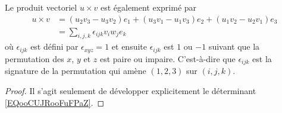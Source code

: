 \begin{lemma}       \label{LEMooYKNPooGVMuse}
	Le produit vectoriel \( u\times v\) est également exprimé par
	\begin{subequations}        \label{EQSooOWGZooNYruoy}
		\begin{align}
			u\times v & =(u_2v_3-u_3v_2)e_1+(u_3v_1-u_1v_3)e_2+(u_1v_2-u_2v_1)e_3     \label{SEBEQooVROKooRpUOIr} \\
			          & =\sum_{i,j,k}\epsilon_{ijk}v_iw_je_k
		\end{align}
	\end{subequations}
	où \( \epsilon_{ijk}\) est défini par \( \epsilon_{xyz}=1\) et ensuite \( \epsilon_{ijk}\) est \( 1\) ou \( -1\) suivant que la permutation des \( x\), \( y\) et \( z\) est paire ou impaire. C'est-à-dire que \( \epsilon_{ijk}\) est la signature de la permutation qui amène \( (1,2,3)\) sur \( (i,j,k)\).
\end{lemma}

\begin{proof}
	Il s'agit seulement de développer explicitement le déterminant \eqref{EQooCUJRooFuFPaZ}.
\end{proof}


